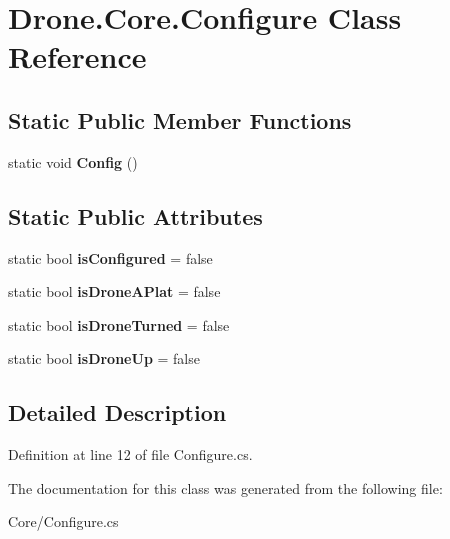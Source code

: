 \hypertarget{class_drone_1_1_core_1_1_configure}{}\section{Drone.\+Core.\+Configure Class Reference}
\label{class_drone_1_1_core_1_1_configure}
\subsection*{Static Public Member Functions}
\begin{DoxyCompactItemize}
\item 
\hypertarget{class_drone_1_1_core_1_1_configure_aea7f2cd48727f2bd756041634382525d}{}static void {\bfseries Config} ()\label{class_drone_1_1_core_1_1_configure_aea7f2cd48727f2bd756041634382525d}

\end{DoxyCompactItemize}
\subsection*{Static Public Attributes}
\begin{DoxyCompactItemize}
\item 
\hypertarget{class_drone_1_1_core_1_1_configure_a7b7fa82e2065651eae7282d2786288fd}{}static bool {\bfseries is\+Configured} = false\label{class_drone_1_1_core_1_1_configure_a7b7fa82e2065651eae7282d2786288fd}

\item 
\hypertarget{class_drone_1_1_core_1_1_configure_a322f7f3d1eb4d0e56caabfb4e3853bfd}{}static bool {\bfseries is\+Drone\+A\+Plat} = false\label{class_drone_1_1_core_1_1_configure_a322f7f3d1eb4d0e56caabfb4e3853bfd}

\item 
\hypertarget{class_drone_1_1_core_1_1_configure_a2a0f26d42636513d24f6e5ec817c6e10}{}static bool {\bfseries is\+Drone\+Turned} = false\label{class_drone_1_1_core_1_1_configure_a2a0f26d42636513d24f6e5ec817c6e10}

\item 
\hypertarget{class_drone_1_1_core_1_1_configure_a9373b6156f90f9bc35bd743d48a98b3f}{}static bool {\bfseries is\+Drone\+Up} = false\label{class_drone_1_1_core_1_1_configure_a9373b6156f90f9bc35bd743d48a98b3f}

\end{DoxyCompactItemize}


\subsection{Detailed Description}


Definition at line 12 of file Configure.\+cs.



The documentation for this class was generated from the following file\+:\begin{DoxyCompactItemize}
\item 
Core/Configure.\+cs\end{DoxyCompactItemize}
